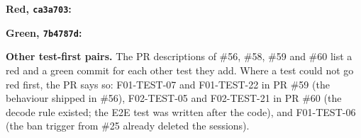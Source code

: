\textbf{Red, \texttt{ca3a703}:}


\textbf{Green, \texttt{7b4787d}:}


\textbf{Other test-first pairs.} The PR descriptions of \#56, \#58, \#59 and \#60 list a red and a green commit for each other test they add. Where a test could not go red first, the PR says so: F01-TEST-07 and F01-TEST-22 in PR \#59 (the behaviour shipped in \#56), F02-TEST-05 and F02-TEST-21 in PR \#60 (the decode rule existed; the E2E test was written after the code), and F01-TEST-06 (the ban trigger from \#25 already deleted the sessions).
